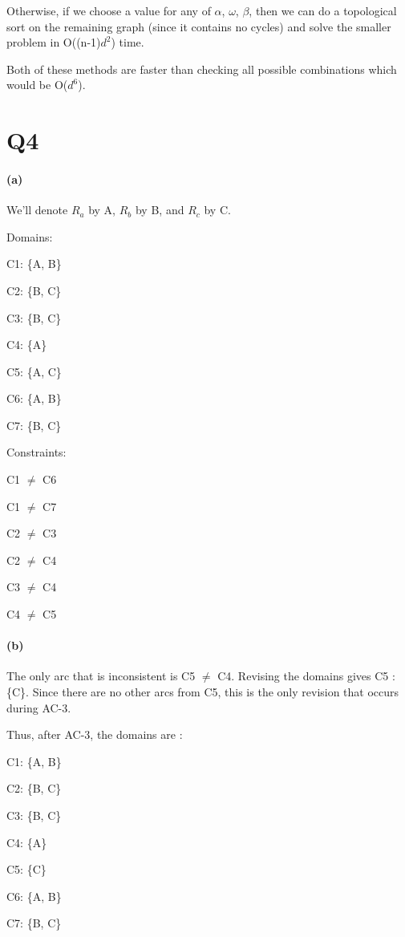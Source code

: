 \documentclass[11pt,a4paper]{article}
\begin{document}
Otherwise, if we choose a value for any of $\alpha$, $\omega$, $\beta$, then we can do a topological sort on the remaining graph (since it contains no cycles) and solve the smaller problem in O((n-1)$d^{2}$) time. 

Both of these methods are faster than checking all possible combinations which would be O($d^{6}$).

\section*{Q4}

\paragraph*{(a)}

We'll denote $R_{a}$ by A, $R_{b}$ by B, and $R_{c}$ by C.

Domains:

C1: \{A, B\}

C2: \{B, C\}

C3: \{B, C\}

C4: \{A\}

C5: \{A, C\}

C6: \{A, B\}

C7: \{B, C\}

Constraints:

C1 $\neq$ C6

C1 $\neq$ C7

C2 $\neq$ C3

C2 $\neq$ C4

C3 $\neq$ C4

C4 $\neq$ C5

\paragraph*{(b)}

The only arc that is inconsistent is C5 $\neq$ C4. Revising the domains gives C5 : \{C\}. Since there are no other arcs from C5, this is the only revision that occurs during AC-3. 

Thus, after AC-3, the domains are :

C1: \{A, B\}

C2: \{B, C\}

C3: \{B, C\}

C4: \{A\}

C5: \{C\}

C6: \{A, B\}

C7: \{B, C\}
\end{document}
